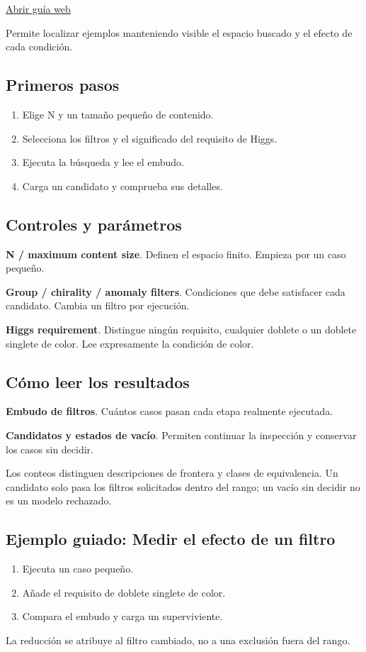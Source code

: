 \documentclass[11pt,a4paper]{article}
\begin{document}
\href{https://karlesmarin.github.io/ghu-explorer/guide/es/sweep5d/index.html}{Abrir guía web}

Permite localizar ejemplos manteniendo visible el espacio buscado y el efecto de cada condición.
\subsection*{Primeros pasos}
\begin{enumerate}
\item Elige N y un tamaño pequeño de contenido.
\item Selecciona los filtros y el significado del requisito de Higgs.
\item Ejecuta la búsqueda y lee el embudo.
\item Carga un candidato y comprueba sus detalles.
\end{enumerate}
\subsection*{Controles y parámetros}
\textbf{N / maximum content size}. Definen el espacio finito. Empieza por un caso pequeño.

\textbf{Group / chirality / anomaly filters}. Condiciones que debe satisfacer cada candidato. Cambia un filtro por ejecución.

\textbf{Higgs requirement}. Distingue ningún requisito, cualquier doblete o un doblete singlete de color. Lee expresamente la condición de color.

\subsection*{Cómo leer los resultados}
\textbf{Embudo de filtros}. Cuántos casos pasan cada etapa realmente ejecutada.

\textbf{Candidatos y estados de vacío}. Permiten continuar la inspección y conservar los casos sin decidir.

Los conteos distinguen descripciones de frontera y clases de equivalencia. Un candidato solo pasa los filtros solicitados dentro del rango; un vacío sin decidir no es un modelo rechazado.
\subsection*{Ejemplo guiado: Medir el efecto de un filtro}
\begin{enumerate}
\item Ejecuta un caso pequeño.
\item Añade el requisito de doblete singlete de color.
\item Compara el embudo y carga un superviviente.
\end{enumerate}
La reducción se atribuye al filtro cambiado, no a una exclusión fuera del rango.
\end{document}
